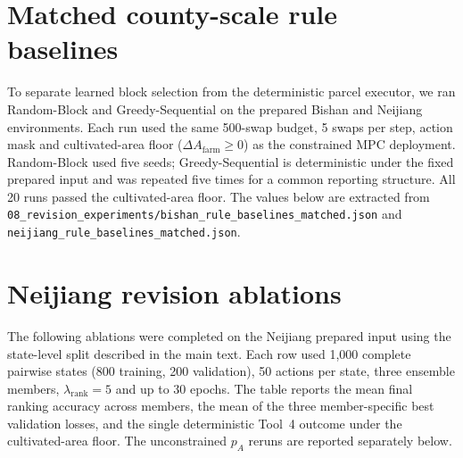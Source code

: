 \documentclass[11pt]{article}
\begin{document}
\section{Matched county-scale rule baselines}\label{si:matched-rule-baselines}
To separate learned block selection from the deterministic parcel executor, we ran Random-Block and Greedy-Sequential on the prepared Bishan and Neijiang environments. Each run used the same 500-swap budget, 5 swaps per step, action mask and cultivated-area floor ($\Delta A_{\mathrm{farm}}\geq0$) as the constrained MPC deployment. Random-Block used five seeds; Greedy-Sequential is deterministic under the fixed prepared input and was repeated five times for a common reporting structure. All 20 runs passed the cultivated-area floor. The values below are extracted from \texttt{08\_revision\_experiments/bishan\_rule\_baselines\_matched.json} and \texttt{neijiang\_rule\_baselines\_matched.json}.

\begin{table}[ht]
\centering
\caption{Matched rule baselines on the two real counties. Values are mean $\pm$ sample standard deviation over five runs; a zero standard deviation indicates deterministic Greedy-Sequential output.}
\label{tab:si-matched-rule-baselines}
\scriptsize
\setlength{\tabcolsep}{3pt}
\end{table}

\section{Neijiang revision ablations}\label{si:neijiang-revision-ablations}
The following ablations were completed on the Neijiang prepared input using the state-level split described in the main text. Each row used 1,000 complete pairwise states (800 training, 200 validation), 50 actions per state, three ensemble members, $\lambda_{\mathrm{rank}}=5$ and up to 30 epochs. The table reports the mean final ranking accuracy across members, the mean of the three member-specific best validation losses, and the single deterministic Tool~4 outcome under the cultivated-area floor. The unconstrained $p_A$ reruns are reported separately below.
\end{document}
